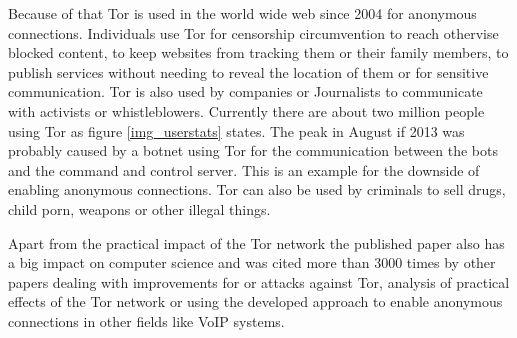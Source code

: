 Because of that Tor is used in the world wide web since 2004 for anonymous connections. Individuals use Tor for censorship circumvention to reach othervise blocked content, to keep websites from tracking them or their family members, to publish services without needing to reveal the location of them or for sensitive communication. Tor is also used by companies or Journalists to communicate with activists or whistleblowers\cite{tor}. Currently there are about two million people using Tor as figure \ref{img_userstats} states. The peak in August if 2013 was probably caused by a botnet using Tor for the communication between the bots and the command and control server\cite{torblog_botnet}. This is an example for the downside of enabling anonymous connections. Tor can also be used by criminals to sell drugs, child porn, weapons or other illegal things.   

Apart from the practical impact of the Tor network the published paper also has a big impact on computer science and was cited more than 3000 times by other papers dealing with improvements for or attacks against Tor, analysis of practical effects of the Tor network or using the developed approach to enable anonymous connections in other fields like VoIP systems.